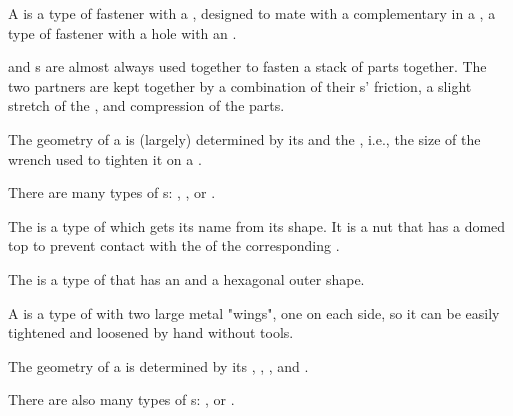 \begin{module}[id=nutbolt]
\begin{definition}
  A  is a type of fastener with a ,
   designed to mate with a complementary
   in a , a type of fastener with a hole with an
  .
\end{definition}

\begin{axiom}
   and s are almost always used together to fasten a stack of parts together. The
  two partners are kept together by a combination of their s' friction, a slight
  stretch of the , and compression of the parts.
\end{axiom}

\begin{definition}
  The geometry of a  is (largely) determined by its  and the
  , i.e., the size of the wrench used to tighten it on a .
\end{definition}

\begin{omtext}
  There are many types of s: ,
  , or .
\end{omtext}

\begin{definition}
  The  is a type of  which gets its name from its shape. It
  is a nut that has a domed top to prevent contact with the
   of the corresponding .
\end{definition}

\begin{definition}
  The  is a type of  that has an  and
  a hexagonal outer shape. 
\end{definition}

\begin{definition}
  A  is a type of  with two large metal "wings", one on each
  side, so it can be easily tightened and loosened by hand without tools.
\end{definition}

\begin{definition}
  The geometry of a  is determined by its , ,
  , and .
\end{definition}

\begin{omtext}
  There are also many types of s: , or
  .
\end{omtext}
\end{module}

